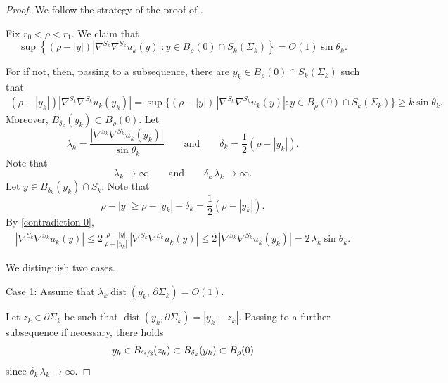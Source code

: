 \documentclass[11pt]{amsart}
\begin{document}
\begin{proof}
	
	We follow the strategy of the proof of \cite[Proposition 4.1]{chodoshedelenli}.
	
Fix $r_0<\rho<r_1$. We claim that
	$$
	\sup\left\{\left(\rho-|y|\right)|\nabla^{S_k}\nabla^{S_k}u_k(y)|:y\in B_{\rho}(0)\cap S_k(\Sigma_k)\right\}=O(1)\sin\theta_k.
	$$

	
	For if not, then, passing to a subsequence, there are $y_k\in B_{\rho}(0)\cap S_k(\Sigma_k)$ such that
	\begin{align} \label{contradiction 0}  
	\left(\rho-|y_k|\right)	|\nabla^{S_k}\nabla^{S_k}u_k(y_k)|=	\sup\{\left(\rho-|y|\right)\,|\nabla^{S_k}\nabla^{S_k}u_k(y)|:y\in B_{\rho}(0)\cap S_k(\Sigma_k)\}\geq k\sin\theta_k.
	\end{align} 
	Moreover, $B_{\delta_k}(y_k)\subset B_\rho(0)$. Let $$\lambda_k=\frac{|\nabla^{S_k}\nabla^{S_k}u_k(y_k)|}{\sin\theta_k}\qquad\text{and}\qquad\delta_k=\frac{1}{2}\left(\rho-|y_k|\right).$$ Note that $$\lambda_k\to\infty\qquad\text{and}\qquad \delta_k\,\lambda_k\to\infty.$$ Let $y\in B_{\delta_k}(y_k)\cap S_k$. Note that 
	$$
	\rho-|y|\geq \rho-|y_k|-\delta_k= \frac{1}{2}\left(\rho-|y_k|\right).
	$$
	By \eqref{contradiction 0}, 
	\begin{align} \label{estimate} 
|\nabla^{S_k}\nabla^{S_k}u_k(y)|\leq2\,\frac{\rho-|y|}{\rho-|y_k|}\,|\nabla^{S_k}\nabla^{S_k}u_k(y)|\leq 2\,|\nabla^{S_k}\nabla^{S_k}u_k(y_k)|= 2\,\lambda_k\sin\theta_k. 
	\end{align} 

	We distinguish two cases.
	
	Case 1: Assume that $\lambda_k\operatorname{dist}(y_k,\,\partial \Sigma_k)=O(1)$. 
	
	Let $z_k\in \partial \Sigma_k$ be such that $\operatorname{dist}(y_k,\partial \Sigma_k)=|y_k-z_k|$. Passing to a further subsequence if necessary, there holds
	 $$y_k\in B_{\sfrac{\delta_k}2}(z_k)\subset B_{\delta_k}(y_k)\subset B_\rho(0)
	 $$
	 since $\delta_k\,\lambda_k\to\infty$.
	

\end{proof}
\end{document}
